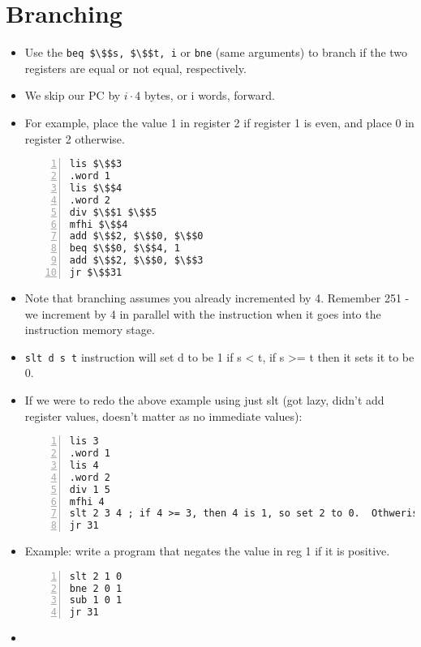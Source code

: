 \documentclass[12pt]{article}
\begin{document}
\section{Branching}
\begin{itemize}
    \item Use the \lstinline[mathescape]{beq $\$$s, $\$$t, i} or \lstinline[mathescape]{bne} (same arguments) to branch if the two registers are equal or not equal, respectively.
    \item We skip our PC by $i \cdot 4$ bytes, or i words, forward.
    \item For example, place the value 1 in register 2 if register 1 is even, and place 0 in register 2 otherwise.
    \begin{lstlisting}[mathescape, numbers=left, breaklines=true]
lis $\$$3
.word 1
lis $\$$4
.word 2
div $\$$1 $\$$5
mfhi $\$$4
add $\$$2, $\$$0, $\$$0
beq $\$$0, $\$$4, 1 
add $\$$2, $\$$0, $\$$3
jr $\$$31
    \end{lstlisting} 
    \item Note that branching assumes you already incremented by 4.  Remember 251 - we increment by 4 in parallel with the instruction when it goes into the instruction memory stage.
    \item \lstinline[mathescape]{slt d s t} instruction will set d to be 1 if s < t, if s >= t then it sets it to be 0.
    \item If we were to redo the above example using just slt (got lazy, didn't add register values, doesn't matter as no immediate values):
        \begin{lstlisting}[mathescape, numbers=left, breaklines=true]
lis 3
.word 1
lis 4
.word 2
div 1 5
mfhi 4
slt 2 3 4 ; if 4 >= 3, then 4 is 1, so set 2 to 0.  Othwerise, if 4 < 3, then 4 must be a 0 (even) and so set 2 to 1.
jr 31
        \end{lstlisting} 
    \item Example: write a program that negates the value in reg 1 if it is positive.
        \begin{lstlisting}[mathescape, numbers=left, breaklines=true]
slt 2 1 0
bne 2 0 1
sub 1 0 1
jr 31
        \end{lstlisting}
    \item  
\end{itemize}
\end{document}
